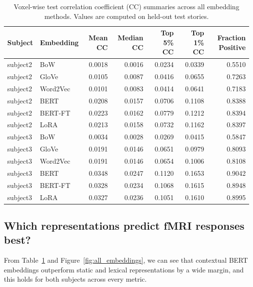 \documentclass[11pt]{article}
\begin{document}
\begin{table}[H]
\centering
\begin{tabular}{llrrrrr}
\toprule
Subject & Embedding & Mean CC & Median CC & Top 5\% CC & Top 1\% CC & Fraction Positive \\
\midrule
subject2 & BoW      & 0.0018 & 0.0016 & 0.0234 & 0.0339 & 0.5510 \\
subject2 & GloVe    & 0.0105 & 0.0087 & 0.0416 & 0.0655 & 0.7263 \\
subject2 & Word2Vec & 0.0101 & 0.0083 & 0.0414 & 0.0641 & 0.7183 \\
subject2 & BERT     & 0.0208 & 0.0157 & 0.0706 & 0.1108 & 0.8388 \\
subject2 & BERT-FT  & 0.0223 & 0.0162 & 0.0779 & 0.1212 & 0.8394 \\
subject2 & LoRA     & 0.0213 & 0.0158 & 0.0732 & 0.1162 & 0.8397 \\
\midrule
subject3 & BoW      & 0.0034 & 0.0028 & 0.0269 & 0.0415 & 0.5847 \\
subject3 & GloVe    & 0.0191 & 0.0146 & 0.0651 & 0.0979 & 0.8093 \\
subject3 & Word2Vec & 0.0191 & 0.0146 & 0.0654 & 0.1006 & 0.8108 \\
subject3 & BERT     & 0.0348 & 0.0247 & 0.1120 & 0.1653 & 0.9042 \\
subject3 & BERT-FT  & 0.0328 & 0.0234 & 0.1068 & 0.1615 & 0.8948 \\
subject3 & LoRA     & 0.0327 & 0.0236 & 0.1051 & 0.1610 & 0.8995 \\
\bottomrule
\end{tabular}
\caption{Voxel-wise test correlation coefficient (CC) summaries across all embedding
methods. Values are computed on held-out test stories.}
\label{tab:all-embedding-results}
\end{table}

\subsection{Which representations predict fMRI responses best?}
From Table~\ref{tab:all-embedding-results} and Figure~\ref{fig:all_embeddings}, we can see that contextual BERT embeddings outperform static and lexical representations by a wide margin, and this holds for both subjects across every metric. 
\end{document}
